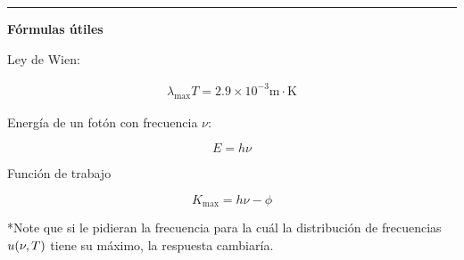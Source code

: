 \documentclass[12pt]{article}
\begin{document}
\noindent\rule{16.5cm}{0.4pt}





\begin{center}
\textbf{Fórmulas útiles}
\end{center}




Ley de Wien:



\begin{align*}
\lambda_{\text{max}} T = 2.9 \times 10^{-3} \text{m} \cdot \text{K}
\end{align*}


Energía de un fotón con frecuencia $\nu$:


\begin{equation*}
E  = h \nu 
\end{equation*}


Función de trabajo

\begin{equation*}
K_{\text{max}} = h \nu - \phi
\end{equation*}


*Note que si le pidieran la frecuencia para la cuál la distribución de frecuencias $u(\nu,T{\tiny })$ tiene su máximo, la respuesta cambiaría.
\end{document}
